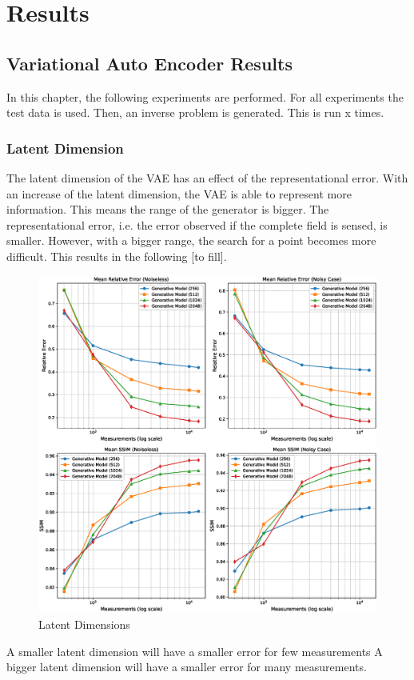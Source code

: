 
\chapter{Results}\label{chapter:results}
\section{Variational Auto Encoder Results}
In this chapter, the following experiments are performed.
For all experiments the test data is used.
Then, an inverse problem is generated.
This is run x times.

\subsection{Latent Dimension}
The latent dimension of the VAE has an effect of the representational error.
With an increase of the latent dimension, the VAE is able to represent more information.
This means the range of the generator is bigger.
The representational error, i.e. the error observed if the complete field is sensed, is smaller.
However, with a bigger range, the search for a point becomes more difficult.
This results in the following [to fill].
\begin{figure}[h!]
    \centering
    \includegraphics[width=\textwidth]{figures/06_results/latent_dimension.eps}
    \caption{Latent Dimensions}
\end{figure}
A smaller latent dimension will have a smaller error for few measurements
A bigger latent dimension will have a smaller error for many measurements.

